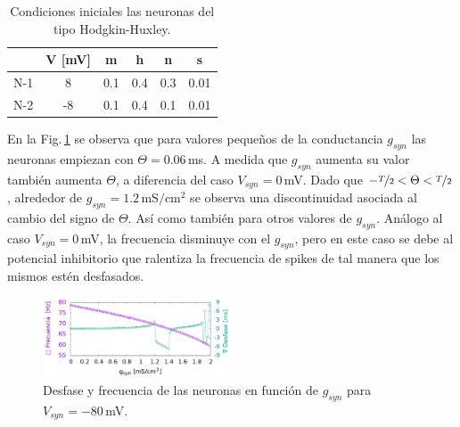 \begin{table}[H]
    \centering
    \begin{tabular}{c| c| c |c |c|c}
    & V [mV] & m    & h     & n     & s     \\ \hline
    N-1       & 8      & 0.1  & 0.4   & 0.3   & 0.01   \\ \hline
    N-2       & -8     & 0.1  & 0.4   & 0.1   & 0.01  \\
   \end{tabular}
    \caption{Condiciones iniciales las neuronas del tipo Hodgkin-Huxley.}  
    \label{tab:ini_in} 
    \end{table}
   En la Fig.\,\ref{fig:des_fre_in} se observa que para valores pequeños de la conductancia $g_{syn}$ las neuronas empiezan con $\Theta= 0.06\,$ms. A medida que $g_{syn}$ aumenta su valor también aumenta $\Theta$, a diferencia del caso $V_{syn}=0\,$mV. Dado que $-\nicefrac{T}{2}<\Theta < \nicefrac{T}{2}$, alrededor de $g_{syn}=1.2\,\text{mS}/\text{cm}^2$ se observa una discontinuidad asociada al cambio del signo de $\Theta$. Así como también para otros valores de $g_{syn}$. Análogo al caso $V_{syn}=0\,$mV, la frecuencia disminuye con el $g_{syn}$, pero en este caso se debe al potencial inhibitorio que ralentiza la frecuencia de spikes de tal manera que los mismos estén desfasados.

   \begin{figure}[H]
            \centering
            \includegraphics[width=0.5\textwidth]{current_15_in.png}
            \caption{Desfase y frecuencia de las neuronas en función de $g_{syn}$ para $V_{syn}=-80\,$mV.}
            \label{fig:des_fre_in}
        \end{figure}


